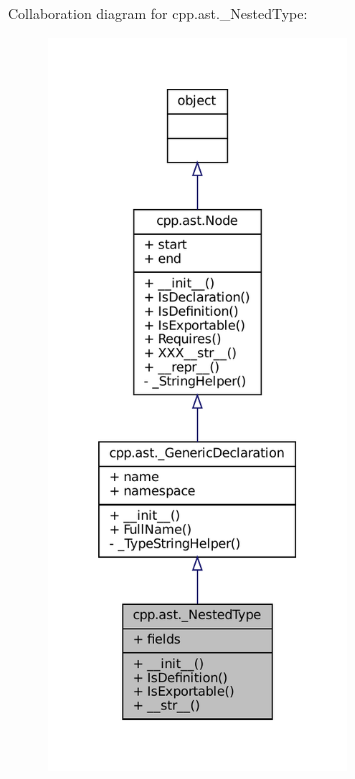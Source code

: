 Collaboration diagram for cpp.\+ast.\+\_\+\+Nested\+Type\+:
\nopagebreak
\begin{figure}[H]
\begin{center}
\leavevmode
\includegraphics[height=550pt]{classcpp_1_1ast_1_1__NestedType__coll__graph}
\end{center}
\end{figure}
